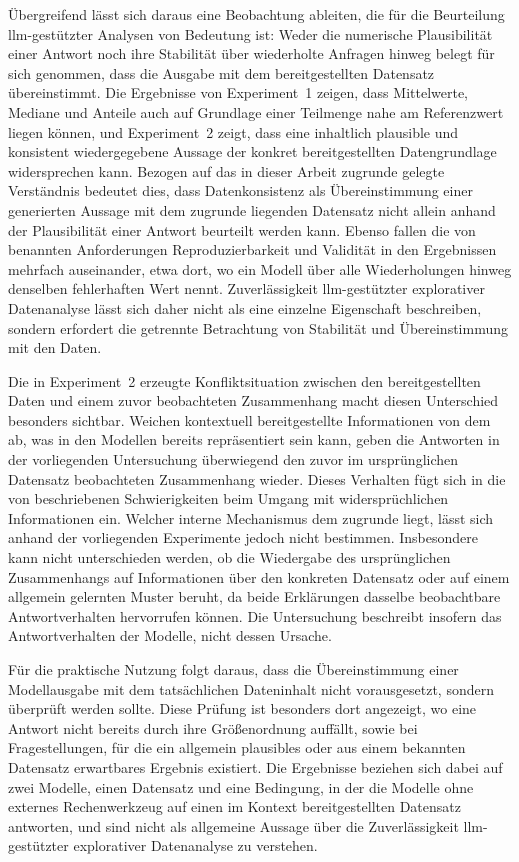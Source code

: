 Übergreifend lässt sich daraus eine Beobachtung ableiten, die für die Beurteilung \gls{llm}-gestützter Analysen von Bedeutung ist: Weder die numerische Plausibilität einer Antwort noch ihre Stabilität über wiederholte Anfragen hinweg belegt für sich genommen, dass die Ausgabe mit dem bereitgestellten Datensatz übereinstimmt. Die Ergebnisse von Experiment~1 zeigen, dass Mittelwerte, Mediane und Anteile auch auf Grundlage einer Teilmenge nahe am Referenzwert liegen können, und Experiment~2 zeigt, dass eine inhaltlich plausible und konsistent wiedergegebene Aussage der konkret bereitgestellten Datengrundlage widersprechen kann. Bezogen auf das in dieser Arbeit zugrunde gelegte Verständnis bedeutet dies, dass Datenkonsistenz als Übereinstimmung einer generierten Aussage mit dem zugrunde liegenden Datensatz nicht allein anhand der Plausibilität einer Antwort beurteilt werden kann. Ebenso fallen die von \textcite{bornschlegl_towards_2024} benannten Anforderungen Reproduzierbarkeit und Validität in den Ergebnissen mehrfach auseinander, etwa dort, wo ein Modell über alle Wiederholungen hinweg denselben fehlerhaften Wert nennt. Zuverlässigkeit \gls{llm}-gestützter explorativer Datenanalyse lässt sich daher nicht als eine einzelne Eigenschaft beschreiben, sondern erfordert die getrennte Betrachtung von Stabilität und Übereinstimmung mit den Daten.

Die in Experiment~2 erzeugte Konfliktsituation zwischen den bereitgestellten Daten und einem zuvor beobachteten Zusammenhang macht diesen Unterschied besonders sichtbar. Weichen kontextuell bereitgestellte Informationen von dem ab, was in den Modellen bereits repräsentiert sein kann, geben die Antworten in der vorliegenden Untersuchung überwiegend den zuvor im ursprünglichen Datensatz beobachteten Zusammenhang wieder. Dieses Verhalten fügt sich in die von \textcite{wang_resolving_2024} beschriebenen Schwierigkeiten beim Umgang mit widersprüchlichen Informationen ein. Welcher interne Mechanismus dem zugrunde liegt, lässt sich anhand der vorliegenden Experimente jedoch nicht bestimmen. Insbesondere kann nicht unterschieden werden, ob die Wiedergabe des ursprünglichen Zusammenhangs auf Informationen über den konkreten Datensatz oder auf einem allgemein gelernten Muster beruht, da beide Erklärungen dasselbe beobachtbare Antwortverhalten hervorrufen können. Die Untersuchung beschreibt insofern das Antwortverhalten der Modelle, nicht dessen Ursache.

Für die praktische Nutzung folgt daraus, dass die Übereinstimmung einer Modellausgabe mit dem tatsächlichen Dateninhalt nicht vorausgesetzt, sondern überprüft werden sollte. Diese Prüfung ist besonders dort angezeigt, wo eine Antwort nicht bereits durch ihre Größenordnung auffällt, sowie bei Fragestellungen, für die ein allgemein plausibles oder aus einem bekannten Datensatz erwartbares Ergebnis existiert. Die Ergebnisse beziehen sich dabei auf zwei Modelle, einen Datensatz und eine Bedingung, in der die Modelle ohne externes Rechenwerkzeug auf einen im Kontext bereitgestellten Datensatz antworten, und sind nicht als allgemeine Aussage über die Zuverlässigkeit \gls{llm}-gestützter explorativer Datenanalyse zu verstehen.

